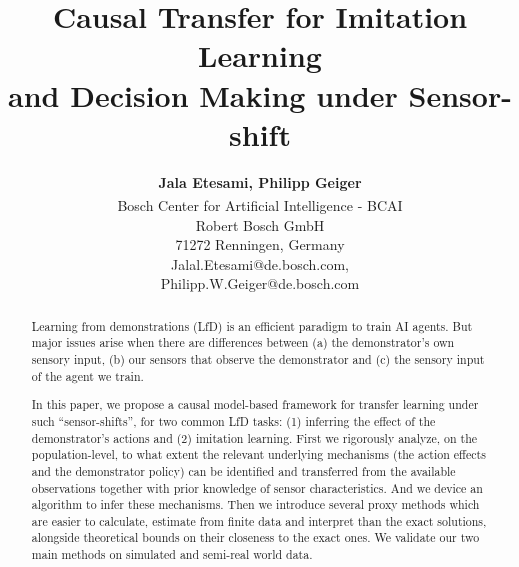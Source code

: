 \documentclass[letterpaper]{article} %
\title{Causal Transfer for Imitation Learning \\ and Decision Making under Sensor-shift}
\author{\Large \textbf{Jala Etesami, Philipp Geiger }\\ %
\textsuperscript{\rm }Bosch Center for Artificial Intelligence - BCAI \\ %
Robert Bosch GmbH\\
71272 Renningen, Germany\\
Jalal.Etesami@de.bosch.com,\\
Philipp.W.Geiger@de.bosch.com %
}
\theoremstyle{definition}%
\theoremstyle{definition}
\newcommand{\todo}[1]{\textcolor{red}{#1}}
\begin{document}
\maketitle

\begin{abstract}
Learning from demonstrations (LfD) is an efficient paradigm to train AI agents. 
But major issues arise when there are differences between (a)  the demonstrator's own sensory input, (b) our sensors that observe the demonstrator and (c) the sensory input of the agent we train.

In this paper, we propose a causal model-based framework for transfer learning under such ``sensor-shifts'', for two common LfD tasks:
(1) inferring the effect of the demonstrator's actions and (2) imitation learning.
%
First we rigorously analyze, on the population-level, to what extent the relevant underlying mechanisms (the action effects and the demonstrator policy) can be identified and transferred from the available observations together with prior knowledge of sensor characteristics. And we device an algorithm to infer these mechanisms.
Then we introduce several proxy methods which are easier to calculate, estimate from finite data and interpret than the exact solutions, alongside theoretical bounds on their closeness to the exact ones.
We validate our two main methods on simulated and semi-real world data.
\end{abstract}
\end{document}
